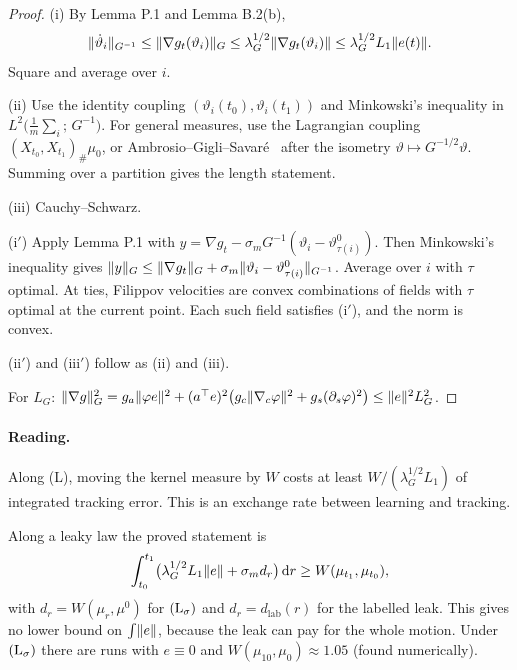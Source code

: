 \begin{proof}
\textup{(i)} By Lemma P.1 and Lemma B.2(b),
\[
  \lVert \dot\vartheta_i\rVert_{G^{-1}}\le\lVert \nabla g_t(\vartheta_i)\rVert_G\le\lambda_G^{1/2}\lVert \nabla g_t(\vartheta_i)\rVert
  \le\lambda_G^{1/2}L_1\lVert e(t)\rVert.
\]
Square and average over $i$.

\textup{(ii)} Use the identity coupling $(\vartheta_i(t_0),\vartheta_i(t_1))$ and Minkowski's inequality in
$L^2\bigl(\frac1m\sum_i;\,G^{-1}\bigr)$. For general measures, use the Lagrangian coupling
$(X_{t_0},X_{t_1})_\#\mu_0$, or Ambrosio--Gigli--Savaré~\cite[Thm.~8.3.1]{ags2008} after the isometry
$\vartheta\mapsto G^{-1/2}\vartheta$. Summing over a partition gives the length statement.

\textup{(iii)} Cauchy--Schwarz.

\textup{(i$'$)} Apply Lemma P.1 with $y=\nabla g_t-\sigma_mG^{-1}(\vartheta_i-\vartheta^0_{\tau(i)})$. Then
Minkowski's inequality gives
$\lVert y\rVert_G\le\lVert \nabla g_t\rVert_G+\sigma_m\lVert \vartheta_i-\vartheta^0_{\tau(i)}\rVert_{G^{-1}}$. Average over $i$ with
$\tau$ optimal. At ties, Filippov velocities are convex combinations of fields with $\tau$ optimal at the current
point. Each such field satisfies (i$'$), and the norm is convex.

\textup{(ii$'$)} and \textup{(iii$'$)} follow as (ii) and (iii).

For $L_G$:
$\lVert \nabla g\rVert^2_G=g_a\lVert \varphi e\rVert^2+(a^\top e)^2\bigl(g_c\lVert \nabla_c\varphi\rVert^2+g_s(\partial_s\varphi)^2\bigr)
\le\lVert e\rVert^2L_G^2$.
\end{proof}

\paragraph{Reading.} Along (L), moving the kernel measure by $W$ costs at least $W/(\lambda_G^{1/2}L_1)$ of integrated
tracking error. This is an exchange rate between learning and tracking.

Along a leaky law the proved statement is
\[
  \int_{t_0}^{t_1}\bigl(\lambda_G^{1/2}L_1\lVert e\rVert+\sigma_m d_r\bigr)\,\mathrm{d} r\ge W(\mu_{t_1},\mu_{t_0}),
\]
with $d_r=W(\mu_r,\mu^0)$ for $(\mathrm{L}_\sigma)$ and $d_r=d_{\mathrm{lab}}(r)$ for the labelled leak. This gives no lower bound on
$\int\lVert e\rVert$, because the leak can pay for the whole motion. Under $(\mathrm{L}_\sigma)$ there are runs with $e\equiv0$ and
$W(\mu_{10},\mu_0)\approx1.05$ (found numerically).

